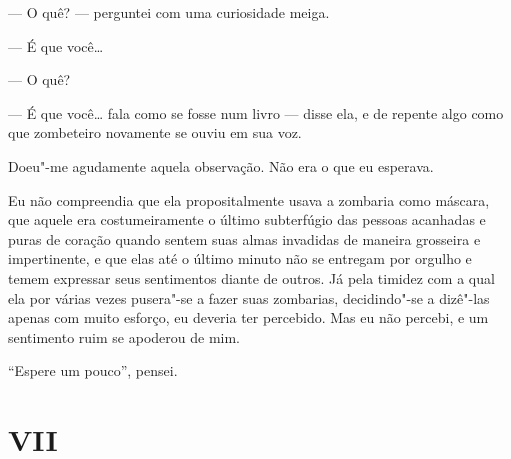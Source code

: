 --- O quê? --- perguntei com uma curiosidade meiga.

--- É que você\ldots{}

--- O quê?

--- É que você\ldots{} fala como se fosse num livro --- disse ela, e de repente
algo como que zombeteiro novamente se ouviu em sua voz.

Doeu"-me agudamente aquela observação. Não era o que eu esperava.
 

Eu não compreendia que ela propositalmente usava a zombaria como
máscara, que aquele era costumeiramente o último subterfúgio das
pessoas acanhadas e puras de coração quando sentem suas almas invadidas
de maneira grosseira e impertinente, e que elas até o último minuto não
se entregam por orgulho e temem expressar seus sentimentos diante de
outros. Já pela timidez com a qual ela por várias vezes pusera"-se a
fazer suas zombarias, decidindo"-se a dizê"-las apenas com muito esforço,
eu deveria ter percebido. Mas eu não percebi, e um sentimento ruim se
apoderou de mim.

“Espere um pouco”, pensei.


\section{VII}


